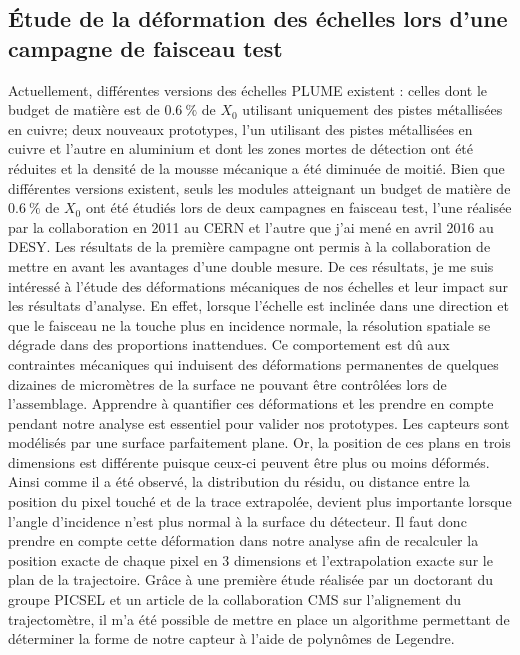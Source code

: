     \subsection{Étude de la déformation des échelles lors d'une campagne de faisceau test}

  Actuellement, différentes versions des échelles PLUME existent : celles dont le budget de matière est de $0.6~\%$ de $X_0$ utilisant uniquement des pistes métallisées en cuivre; deux nouveaux prototypes, l'un utilisant des pistes métallisées en cuivre et l'autre en aluminium et dont les zones mortes de détection ont été réduites et la densité de la mousse mécanique a été diminuée de moitié.
  Bien que différentes versions existent, seuls les modules atteignant un budget de matière de $0.6~\%$ de $X_0$ ont été étudiés lors de deux campagnes en faisceau test, l'une réalisée par la collaboration en 2011 au CERN et l'autre que j'ai mené en avril 2016 au DESY.
  Les résultats de la première campagne ont permis à la collaboration de mettre en avant les avantages d'une double mesure. 
  De ces résultats, je me suis intéressé à l'étude des déformations mécaniques de nos échelles et leur impact sur les résultats d'analyse.
  En effet, lorsque l'échelle est inclinée dans une direction et que le faisceau ne la touche plus en incidence normale, la résolution spatiale se dégrade dans des proportions inattendues.
  Ce comportement est dû aux contraintes mécaniques qui induisent des déformations permanentes de quelques dizaines de micromètres de la surface ne pouvant être contrôlées lors de l'assemblage.
  Apprendre à quantifier ces déformations et les prendre en compte pendant notre analyse est essentiel pour valider nos prototypes.
  Les capteurs sont modélisés par une surface parfaitement plane.
  Or, la position de ces plans en trois dimensions est différente puisque ceux-ci peuvent être plus ou moins déformés.
  Ainsi comme il a été observé, la distribution du résidu, ou distance entre la position du pixel touché et de la trace extrapolée, devient plus importante lorsque l'angle d'incidence n'est plus normal à la surface du détecteur.
  Il faut donc prendre en compte cette déformation dans notre analyse afin de recalculer la position exacte de chaque pixel en 3 dimensions et l'extrapolation exacte sur le plan de la trajectoire. 
  Grâce à une première étude réalisée par un doctorant du groupe PICSEL et un article de la collaboration CMS sur l'alignement du trajectomètre\cite{Chatrchyan:2009sr}, il m'a été possible de mettre en place un algorithme permettant de déterminer la forme de notre capteur à l'aide de polynômes de Legendre. 
